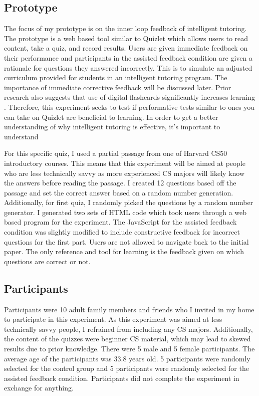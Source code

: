 \documentclass[acmtog]{acmart}
\begin{document}
\subsection{Prototype}
The focus of my prototype is on the inner loop feedback of intelligent tutoring. The prototype is a web based tool similar to Quizlet which allows users to read content, take a quiz, and record results. Users are given immediate feedback on their performance and participants in the assisted feedback condition are given a rationale for questions they answered incorrectly. This is to simulate an adjusted curriculum provided for students in an intelligent tutoring program. The importance of immediate corrective feedback will be discussed later. Prior research also suggests that use of digital flashcards significantly increases learning \cite{yuksel2020digital}. Therefore, this experiment seeks to test if performative tests similar to ones you can take on Quizlet are beneficial to learning. In order to get a better understanding of why intelligent tutoring is effective, it's important to understand 

For this specific quiz, I used a partial passage from one of Harvard CS50 introductory courses. This means that this experiment will be aimed at people who are less technically savvy as more experienced CS majors will likely know the answers before reading the passage. I created 12 questions based off the passage and set the correct answer based on a random number generation. Additionally, for first quiz, I randomly picked the questions by a random number generator. I generated two sets of HTML code  which took users through a web based program for the experiment. The JavaScript for the assisted feedback condition was slightly modified to include constructive feedback for incorrect questions for the first part. Users are not allowed to navigate back to the initial paper. The only reference and tool for learning is the feedback given on which questions are correct or not.

\subsection{Participants}
Participants were 10 adult family members and friends who I invited in my home to participate in this experiment. As this experiment was aimed at less technically savvy people, I refrained from including any CS majors. Additionally, the content of the quizzes were beginner CS material, which may lead to skewed results due to prior knowledge. There were 5 male and 5 female participants. The average age of the participants was 33.8 years old. 5 participants were randomly selected for the control group and 5 participants were randomly selected for the assisted feedback condition. Participants did not complete the experiment in exchange for anything.
\end{document}
